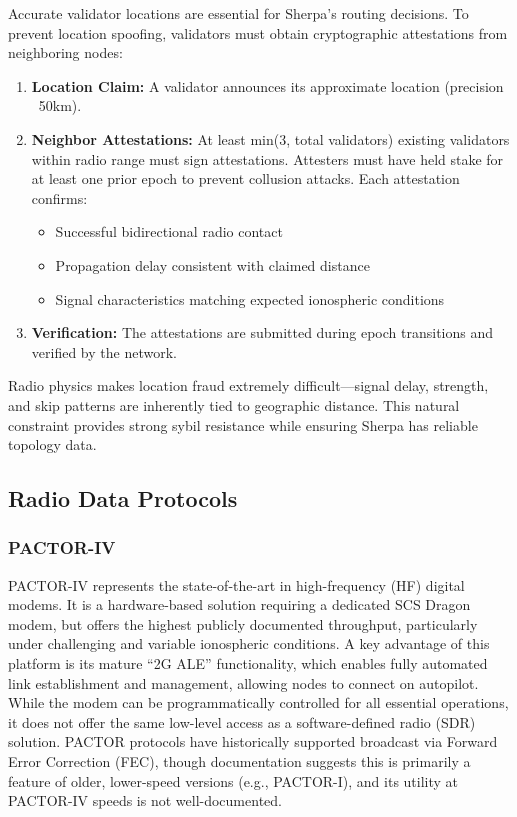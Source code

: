 \documentclass{article}
\begin{document}
Accurate validator locations are essential for Sherpa's routing decisions. To prevent location spoofing, validators must obtain cryptographic attestations from neighboring nodes:

\begin{enumerate}
    \item \textbf{Location Claim:} A validator announces its approximate location (precision ~50km).
    \item \textbf{Neighbor Attestations:} At least min(3, total validators) existing validators within radio range must sign attestations. Attesters must have held stake for at least one prior epoch to prevent collusion attacks. Each attestation confirms:
        \begin{itemize}
            \item Successful bidirectional radio contact
            \item Propagation delay consistent with claimed distance
            \item Signal characteristics matching expected ionospheric conditions
        \end{itemize}
    \item \textbf{Verification:} The attestations are submitted during epoch transitions and verified by the network.
\end{enumerate}

Radio physics makes location fraud extremely difficult—signal delay, strength, and skip patterns are inherently tied to geographic distance. This natural constraint provides strong sybil resistance while ensuring Sherpa has reliable topology data.

\subsection{Radio Data Protocols}

\subsubsection{PACTOR-IV}

PACTOR-IV represents the state-of-the-art in high-frequency (HF) digital modems. It is a hardware-based solution requiring a dedicated SCS Dragon modem, but offers the highest publicly documented throughput, particularly under challenging and variable ionospheric conditions. A key advantage of this platform is its mature ``2G ALE'' functionality, which enables fully automated link establishment and management, allowing nodes to connect on autopilot. While the modem can be programmatically controlled for all essential operations, it does not offer the same low-level access as a software-defined radio (SDR) solution. PACTOR protocols have historically supported broadcast via Forward Error Correction (FEC), though documentation suggests this is primarily a feature of older, lower-speed versions (e.g., PACTOR-I), and its utility at PACTOR-IV speeds is not well-documented.
\end{document}
